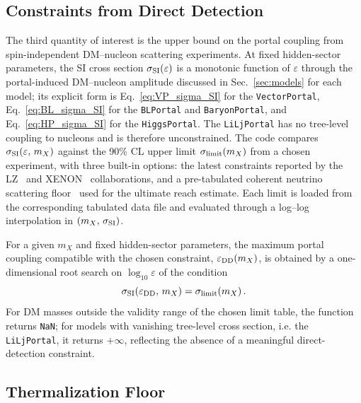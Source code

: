 \documentclass[11pt]{article}
\numberwithin{equation}{section}
\begin{document}
\subsection{Constraints from Direct Detection}
\label{sec:DD}


The third quantity of interest is the upper bound on the portal coupling from spin-independent DM--nucleon scattering experiments. At fixed hidden-sector parameters, the SI cross section $\sigma_{\rm SI}(\varepsilon)$ is a monotonic function of $\varepsilon$ through the portal-induced DM--nucleon amplitude discussed in Sec.~\ref{sec:models} for each model; its explicit form is Eq.~\eqref{eq:VP_sigma_SI} for the \texttt{VectorPortal}, Eq.~\eqref{eq:BL_sigma_SI} for the \texttt{BLPortal} and \texttt{BaryonPortal}, and Eq.~\eqref{eq:HP_sigma_SI} for the \texttt{HiggsPortal}. The \texttt{LiLjPortal} has no tree-level coupling to nucleons and is therefore unconstrained. The code compares $\sigma_{\rm SI}(\varepsilon,\,m_X)$ against the 90\% CL upper limit $\sigma_{\rm limit}(m_X)$ from a chosen experiment, with three built-in options: the latest constraints reported by the LZ~\cite{LZ:2024zvo} and XENON~\cite{XENON:2025vwd} collaborations, and a pre-tabulated coherent neutrino scattering floor~\cite{OHare:2021utq} used for the ultimate reach estimate. Each limit is loaded from the corresponding tabulated data file and evaluated through a log--log interpolation in $(m_X,\,\sigma_{\rm SI})$.

For a given $m_X$ and fixed hidden-sector parameters, the maximum portal coupling compatible with the chosen constraint, $\varepsilon_{\rm DD}(m_X)$, is obtained by a one-dimensional root search on $\log_{10}\varepsilon$ of the condition
\begin{equation}
    \sigma_{\rm SI}\!\left(\varepsilon_{\rm DD},\,m_X\right) = \sigma_{\rm limit}(m_X)\,.
\end{equation}
For DM masses outside the validity range of the chosen limit table, the function returns \texttt{NaN}; for models with vanishing tree-level cross section, i.e. the \texttt{LiLjPortal}, it returns $+\infty$, reflecting the absence of a meaningful direct-detection constraint.



\subsection{Thermalization Floor}
\label{sec:thermal_floor}
\end{document}
